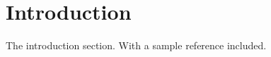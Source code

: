 
\section{Introduction} %
\label{sec:introduction}
	The introduction section.
    With a sample reference \citep{cranny2016bad} included.
